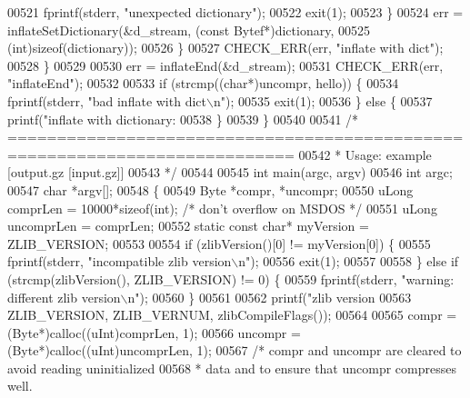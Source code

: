 \begin{DoxyCode}
{{{{{{{{{{{{{{00521                 fprintf(stderr, \textcolor{stringliteral}{"unexpected dictionary"});
00522                 exit(1);
00523             \}
00524             err = inflateSetDictionary(&d\_stream, (\textcolor{keyword}{const} Bytef*)dictionary,
00525                                        (\textcolor{keywordtype}{int})\textcolor{keyword}{sizeof}(dictionary));
00526         \}
00527         CHECK\_ERR(err, \textcolor{stringliteral}{"inflate with dict"});
00528     \}
00529 
00530     err = inflateEnd(&d\_stream);
00531     CHECK\_ERR(err, \textcolor{stringliteral}{"inflateEnd"});
00532 
00533     \textcolor{keywordflow}{if} (strcmp((\textcolor{keywordtype}{char}*)uncompr, hello)) \{
00534         fprintf(stderr, \textcolor{stringliteral}{"bad inflate with dict\(\backslash\)n"});
00535         exit(1);
00536     \} \textcolor{keywordflow}{else} \{
00537         printf(\textcolor{stringliteral}{"inflate with dictionary: %
00538     \}
00539 \}
00540 
00541 \textcolor{comment}{/* ===========================================================================}
00542 \textcolor{comment}{ * Usage:  example [output.gz  [input.gz]]}
00543 \textcolor{comment}{ */}
00544 
00545 \textcolor{keywordtype}{int} main(argc, argv)
00546     \textcolor{keywordtype}{int} argc;
00547     \textcolor{keywordtype}{char} *argv[];
00548 \{
00549     Byte *compr, *uncompr;
00550     uLong comprLen = 10000*\textcolor{keyword}{sizeof}(int); \textcolor{comment}{/* don't overflow on MSDOS */}
00551     uLong uncomprLen = comprLen;
00552     \textcolor{keyword}{static} \textcolor{keyword}{const} \textcolor{keywordtype}{char}* myVersion = ZLIB\_VERSION;
00553 
00554     \textcolor{keywordflow}{if} (zlibVersion()[0] != myVersion[0]) \{
00555         fprintf(stderr, \textcolor{stringliteral}{"incompatible zlib version\(\backslash\)n"});
00556         exit(1);
00557 
00558     \} \textcolor{keywordflow}{else} \textcolor{keywordflow}{if} (strcmp(zlibVersion(), ZLIB\_VERSION) != 0) \{
00559         fprintf(stderr, \textcolor{stringliteral}{"warning: different zlib version\(\backslash\)n"});
00560     \}
00561 
00562     printf(\textcolor{stringliteral}{"zlib version %
00563             ZLIB\_VERSION, ZLIB\_VERNUM, zlibCompileFlags());
00564 
00565     compr    = (Byte*)calloc((uInt)comprLen, 1);
00566     uncompr  = (Byte*)calloc((uInt)uncomprLen, 1);
00567     \textcolor{comment}{/* compr and uncompr are cleared to avoid reading uninitialized}
00568 \textcolor{comment}{     * data and to ensure that uncompr compresses well.}
}}}}}}}}}}}}}}}}
\end{DoxyCode}
